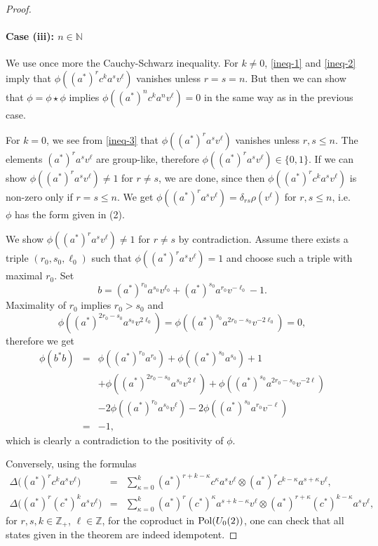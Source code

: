 \documentclass[12pt]{amsart}
\theoremstyle{definition}
\theoremstyle{remark}
\numberwithin{equation}{section}
\begin{document}
\begin{proof}
\paragraph{Case (iii): $n\in\mathbb{N}$}
We use once more the Cauchy-Schwarz inequality. For $k\not=0$, \eqref{ineq-1} and \eqref{ineq-2}
imply that $\phi\left((a^*)^r c^k a^s v^\ell\right)$ vanishes unless $r=s=n$. But then we can show
that $\phi=\phi\star\phi$ implies $\phi\left((a^*)^n c^k a^n v^\ell\right)=0$ in the same way as in
the previous case.

For $k=0$, we see from \eqref{ineq-3} that $\phi\left((a^*)^r a^s
  v^\ell\right)$ vanishes unless $r,s\le n$. The elements $(a^*)^r a^s
  v^\ell$ are group-like, therefore $\phi\left((a^*)^r a^s
  v^\ell\right)\in\{0,1\}$. If we can show $\phi\left((a^*)^r
  a^s v^\ell\right)\not=1$ for $r\not=s$, we are done, since then
$\phi\left((a^*)^r c^k a^s v^\ell\right)$ is non-zero only if $r=s\le n$.
We get $\phi\left((a^*)^r a^s v^\ell\right)= \delta_{rs}\rho(v^\ell)$ for
$r,s\le n$, i.e.\
$\phi$ has the form given in (2).

We show $\phi\left((a^*)^r
  a^s v^\ell\right)\not=1$ for $r\not=s$ by contradiction. Assume
there exists a triple $(r_0,s_0,\ell_0)$ such that $\phi\left((a^*)^r
  a^s v^\ell\right)=1$ and choose such a triple with maximal $r_0$. Set
\[
b=(a^*)^{r_0}a^{s_0}v^{\ell_0} + (a^*)^{s_0}a^{r_0}v^{-\ell_0} -1.
\]
Maximality of $r_0$ implies $r_0>s_0$ and
\[
\phi\left((a^*)^{2r_0-s_0}a^{s_0}v^{2\ell_0}\right)=\phi\left((a^*)^{s_0}a^{2r_0-s_0}v^{-2\ell_0}\right)=0,
\]
therefore we get
\begin{eqnarray*}
\phi(b^*b) &=&
\phi\left((a^*)^{r_0}a^{r_0}\right)
+\phi\left((a^*)^{s_0}a^{s_0}\right)
+1 \\
&& +\phi\left((a^*)^{2r_0-s_0}a^{s_0}v^{2\ell}\right)
+\phi\left((a^*)^{s_0}a^{2r_0-s_0}v^{-2\ell}\right) \\
&& -2\phi\left((a^*)^{r_0}a^{s_0}v^{\ell}\right)
-2\phi\left((a^*)^{s_0}a^{r_0}v^{-\ell}\right) \\
&=& -1,
\end{eqnarray*}
which is clearly a contradiction to the positivity of $\phi$.

Conversely, using the formulas
\begin{eqnarray*}\Delta\big((a^*)^r c^k a^s v^\ell\big) &=& \sum_{\kappa=0}^k
(a^*)^{r+k-\kappa}c^\kappa a^s v^\ell \otimes (a^*)^r
c^{k-\kappa}a^{s+\kappa}v^\ell, \\
\Delta\big((a^*)^r (c^*)^k a^s v^\ell\big) &=& \sum_{\kappa=0}^k
(a^*)^r (c^*)^\kappa a^{s+k-\kappa} v^\ell \otimes (a^*)^{r+\kappa}
(c^*)^{k-\kappa}a^s v^\ell,
\end{eqnarray*}
for $r,s,k\in\mathbb{Z}_+$, $\ell\in\mathbb{Z}$,
for the coproduct in ${\rm Pol}(U_0(2))$, one can check that all states given
in the theorem are indeed idempotent.
\end{proof}
\end{document}
